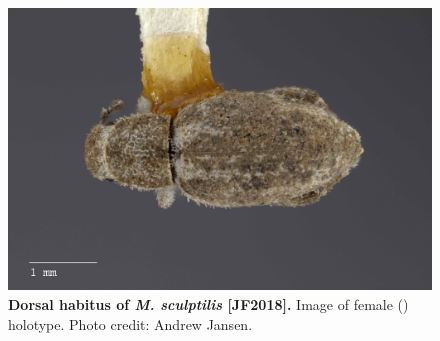 \documentclass[fleqn,10pt,lineno]{wlpeerj} %
\begin{document}
\begin{figure}[h]
	\begin{sideways}
		\centering
		\includegraphics[height=\textwidth]{figure23.jpg}
	\end{sideways}
	\caption{\textbf{Dorsal habitus of \textit{M. sculptilis} [JF2018].} Image of female (\female) holotype. Photo credit: Andrew Jansen.}
	\label{fig:sculptilis_F_dorsal}
\end{figure}
\end{document}
